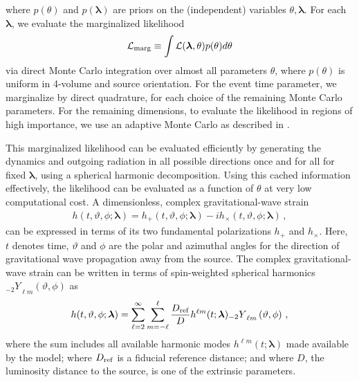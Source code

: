 \documentclass[twocolumn,prd,nofootinbib]{revtex4}
\newcommand\Y[1]{{{}_{#1}Y}}
\begin{document}
where $p(\theta)$ and $p(\bm{\lambda})$ are priors on the (independent) variables $\theta ,\bm{\lambda}$. For each $\bm{\lambda}$, we evaluate the marginalized likelihood
\begin{equation}
\label{eq:lnLmarg}
 {\cal L}_{\rm marg}\equiv\int  {\cal L}(\bm{\lambda} ,\theta )p(\theta )d\theta
\end{equation}
via direct Monte Carlo integration over almost all parameters $\theta$, where $p(\theta)$ is uniform in 4-volume and source orientation.  
For the event time parameter, we marginalize by direct quadrature, for each choice of the remaining Monte Carlo parameters.
For the remaining dimensions, to evaluate the likelihood in regions of high importance, we use an adaptive Monte Carlo as described in
\cite{gwastro-PE-AlternativeArchitectures}.    


This marginalized likelihood can be evaluated efficiently
by  generating the dynamics and outgoing radiation in all possible directions once and for all for fixed
$\bm{\lambda}$, using a spherical harmonic decomposition.  Using this cached information effectively,  the likelihood can be evaluated as a function of $\theta$ at very low computational cost.  
A dimensionless, complex gravitational-wave
strain
\begin{align} \label{eq:strain}
h(t,\vartheta,\phi;\bm{\lambda}) =  h_+(t,\vartheta,\phi;\bm{\lambda}) - 
                                i h_\times (t,\vartheta,\phi;\bm{\lambda}) \, ,
\end{align}
can be expressed in terms of its two fundamental polarizations $h_+$ and $h_\times$.
Here, $t$ denotes time, $\vartheta$ and $\phi$ are the polar and azimuthal angles
for the direction of gravitational wave propagation away from the source. 
The complex gravitational-wave strain can be written in terms of
spin-weighted spherical harmonics $\Y{-2}_{\ell m} \left(\vartheta, \phi \right)$ as 
\begin{align} \label{eq:strain_mode}
h(t,\vartheta,\phi;\bm{\lambda}) = 
\sum_{\ell=2}^{\infty} \sum_{m=-\ell}^{\ell} \frac{D_{\rm ref}}{D} h^{\ell m}(t;\bm{\lambda}) \Y{-2}_{\ell m} \left(\vartheta, \phi \right) \, ,
\end{align}
where the sum includes all available harmonic modes $h^{\ell m}(t;\pmb{\bm{\lambda}})$ made available by the model;  where
$D_{\rm ref}$ is a fiducial reference distance; and where $D$, the luminosity distance to the  source, is one of the
extrinsic parameters.  
\end{document}
